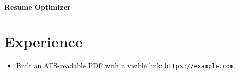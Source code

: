 \documentclass[10pt,a4paper]{article}
\begin{document}
{\headingfont\bfseries Resume Optimizer}
\section*{Experience}
\begin{itemize}
  \item Built an ATS-readable PDF with a visible link:
  \href{https://example.com}{\nolinkurl{https://example.com}}.
\end{itemize}
\end{document}
